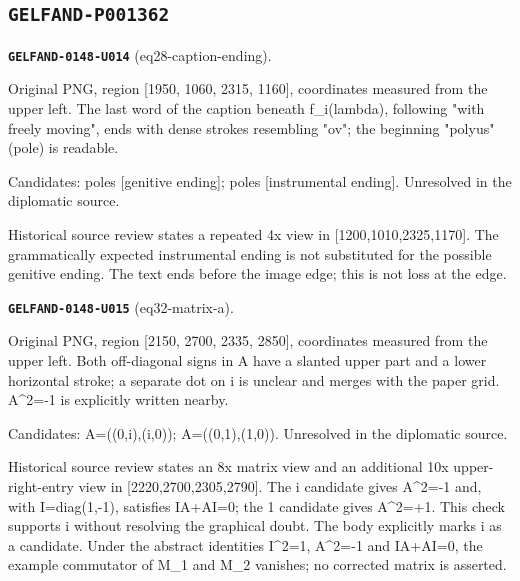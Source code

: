 \documentclass[11pt]{article}
\theoremstyle{definition}
\theoremstyle{remark}
\begin{document}
\subsection*{\texttt{GELFAND-P001362}}
\noindent\leavevmode{}\label{GELFAND-P001362:eq28-caption-ending:note}\textbf{\texttt{GELFAND-0148-U014}} (eq28-caption-ending).\par\nopagebreak[4]
Original PNG, region [1950, 1060, 2315, 1160], coordinates measured from the upper left. The last word of the caption beneath f\_i(lambda), following "with freely moving", ends with dense strokes resembling "ov"; the beginning "polyus" (pole) is readable.\par
Candidates: poles [genitive ending]; poles [instrumental ending]. Unresolved in the diplomatic source.\par
Historical source review states a repeated 4x view in [1200,1010,2325,1170]. The grammatically expected instrumental ending is not substituted for the possible genitive ending. The text ends before the image edge; this is not loss at the edge.\par\medskip
\noindent\leavevmode{}\label{GELFAND-P001362:eq32-matrix-a:note}\textbf{\texttt{GELFAND-0148-U015}} (eq32-matrix-a).\par\nopagebreak[4]
Original PNG, region [2150, 2700, 2335, 2850], coordinates measured from the upper left. Both off-diagonal signs in A have a slanted upper part and a lower horizontal stroke; a separate dot on i is unclear and merges with the paper grid. A\textasciicircum{}2=-1 is explicitly written nearby.\par
Candidates: A=((0,i),(i,0)); A=((0,1),(1,0)). Unresolved in the diplomatic source.\par
Historical source review states an 8x matrix view and an additional 10x upper-right-entry view in [2220,2700,2305,2790]. The i candidate gives A\textasciicircum{}2=-1 and, with I=diag(1,-1), satisfies IA+AI=0; the 1 candidate gives A\textasciicircum{}2=+1. This check supports i without resolving the graphical doubt. The body explicitly marks i as a candidate. Under the abstract identities I\textasciicircum{}2=1, A\textasciicircum{}2=-1 and IA+AI=0, the example commutator of M\_1 and M\_2 vanishes; no corrected matrix is asserted.\par\medskip
\end{document}
